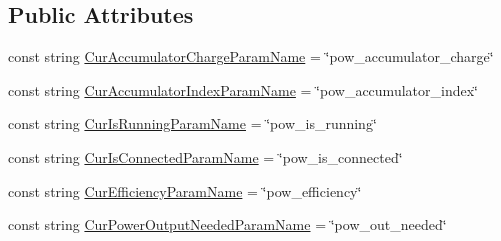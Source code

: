 \subsection*{Public Attributes}
\begin{DoxyCompactItemize}
\item 
const string \hyperlink{class_project_porcupine_1_1_buildable_1_1_components_1_1_power_connection_1_1_power_connection_parameter_definitions_ab854fa88f5bd37226ce16be83f9280a4}{Cur\+Accumulator\+Charge\+Param\+Name} = \char`\"{}pow\+\_\+accumulator\+\_\+charge\char`\"{}
\item 
const string \hyperlink{class_project_porcupine_1_1_buildable_1_1_components_1_1_power_connection_1_1_power_connection_parameter_definitions_ad102141d8915a8ff68c08df2616ee71c}{Cur\+Accumulator\+Index\+Param\+Name} = \char`\"{}pow\+\_\+accumulator\+\_\+index\char`\"{}
\item 
const string \hyperlink{class_project_porcupine_1_1_buildable_1_1_components_1_1_power_connection_1_1_power_connection_parameter_definitions_ae92f54bead5456a3fe78816791783182}{Cur\+Is\+Running\+Param\+Name} = \char`\"{}pow\+\_\+is\+\_\+running\char`\"{}
\item 
const string \hyperlink{class_project_porcupine_1_1_buildable_1_1_components_1_1_power_connection_1_1_power_connection_parameter_definitions_a5f33d96a60c0ea74d1feab5d5ee7f4da}{Cur\+Is\+Connected\+Param\+Name} = \char`\"{}pow\+\_\+is\+\_\+connected\char`\"{}
\item 
const string \hyperlink{class_project_porcupine_1_1_buildable_1_1_components_1_1_power_connection_1_1_power_connection_parameter_definitions_ab43ce85e33fdff8a653c74e11d726b71}{Cur\+Efficiency\+Param\+Name} = \char`\"{}pow\+\_\+efficiency\char`\"{}
\item 
const string \hyperlink{class_project_porcupine_1_1_buildable_1_1_components_1_1_power_connection_1_1_power_connection_parameter_definitions_afa4062d4705d60a0b11472cdd7d65330}{Cur\+Power\+Output\+Needed\+Param\+Name} = \char`\"{}pow\+\_\+out\+\_\+needed\char`\"{}
\end{DoxyCompactItemize}
